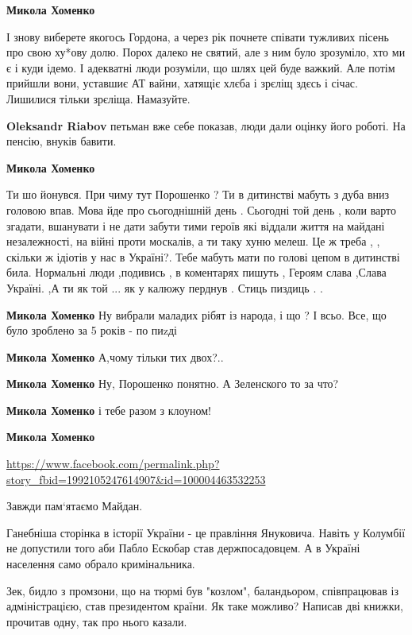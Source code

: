 \begin{itemize}
\begin{itemize}
\textbf{Микола Хоменко} 

І знову виберете якогось Гордона, а через рік почнете співати тужливих пісень
про свою ху*ову долю. Порох далеко не святий, але з ним було зрозуміло, хто ми
є і куди ідемо. І адекватні люди розуміли, що шлях цей буде важкий. Але потім
прийшли вони, уставшиє АТ вайни, хатящіє хлєба і зрєліщ здєсь і січас. Лишилися
тільки зрєліща. Намазуйте.


\textbf{Oleksandr Riabov} петьман вже себе показав, люди дали оцінку його роботі. На пенсію, внуків бавити.

\textbf{Микола Хоменко} 

Ти шо йонувся. При чиму тут Порошенко ? Ти в дитинстві мабуть з дуба вниз
головою впав. Мова йде про сьогоднішній день . Сьогодні той день , коли варто
згадати, вшанувати і не дати забути тими героїв які віддали життя на майдані
незалежності, на війні проти москалів, а ти таку хуню мелеш. Це ж треба , ,
скільки ж ідіотів у нас в Україні?. Тебе мабуть мати по голові цепом в
дитинстві била. Нормальні люди ,подивись , в коментарях пишуть , Героям слава
,Слава Україні. ,А ти як той ... як у калюжу перднув . Стиць пиздиць . .

\textbf{Микола Хоменко} Ну вибрали маладих рібят із народа, і що ? І всьо. Все, що було зроблено за 5 років - по пиzді

\textbf{Микола Хоменко} А,чому тільки тих двох?..

\textbf{Микола Хоменко} Ну, Порошенко понятно. А Зеленского то за что?

\textbf{Микола Хоменко} і тебе разом з клоуном!

\textbf{Микола Хоменко}

\end{itemize} %


\url{https://www.facebook.com/permalink.php?story_fbid=1992105247614907&id=100004463532253}


Завжди пам`ятаємо Майдан.

Ганебніша сторінка в історії України - це правління Януковича. Навіть у
Колумбії не допустили того аби Пабло Ескобар став держпосадовцем. А в Україні
населення само обрало кримінальника.

Зек, бидло з промзони, що на тюрмі був "козлом", баландьором, співпрацював із
адміністрацією, став президентом країни. Як таке можливо? Написав дві книжки,
прочитав одну, так про нього казали.


\end{itemize}
